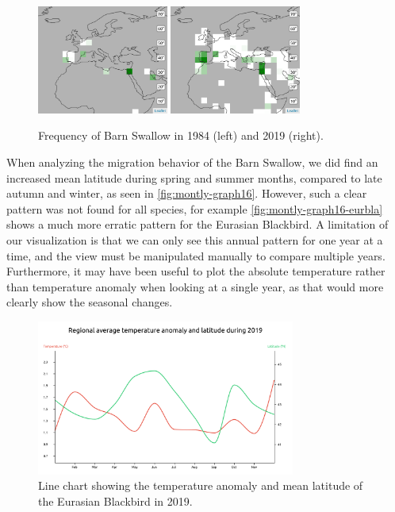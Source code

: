 \documentclass[journal]{vgtc}                %
\begin{document}
\begin{figure}[h]
  \centering
    \includegraphics[width=43mm]{bird-map-barswa-1984-03.png}
    \hfill
    \includegraphics[width=43mm]{bird-map-barswa-2019-03.png}
    \caption{Frequency of Barn Swallow in 1984 (left) and 2019 (right).}
    \label{fig:birds-comparison}
\end{figure}

When analyzing the migration behavior of the Barn Swallow, we did find an increased mean latitude during spring and summer months, compared to late autumn and winter, as seen in \autoref{fig:montly-graph16}. However, such a clear pattern was not found for all species, for example \autoref{fig:montly-graph16-eurbla} shows a much more erratic pattern for the Eurasian Blackbird. A limitation of our visualization is that we can only see this annual pattern for one year at a time, and the view must be manipulated manually to compare multiple years. Furthermore, it may have been useful to plot the absolute temperature rather than temperature anomaly when looking at a single year, as that would more clearly show the seasonal changes.

\begin{figure}[h]
  \centering
  \includegraphics[width=85mm]{montly-graph16-eurbla.png}
  \caption{Line chart showing  the temperature anomaly and mean latitude of the Eurasian Blackbird in 2019.}
  \label{fig:montly-graph16-eurbla}
\end{figure}
\end{document}
